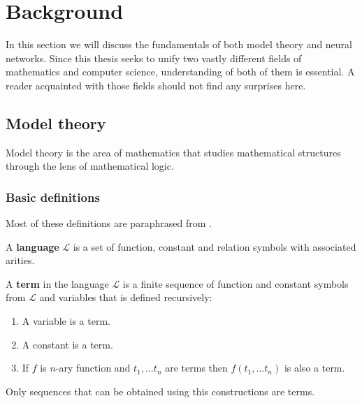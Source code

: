 \chapter{Background}
In this section we will discuss the fundamentals of both model theory and neural networks. Since this thesis seeks to unify two vastly different fields of mathematics and computer science, understanding of both of them is essential. A reader acquainted with those fields should not find any surprises here.


\section{Model theory}
Model theory is the area of mathematics that studies mathematical structures through the lens of mathematical logic.
\subsection{Basic definitions}
\label{section:basics}
Most of these definitions are paraphrased from \cite{model}.
\begin{defn} A \textbf{language} $\mathcal{L}$ is a set of function, constant and relation symbols with associated arities.
\end{defn}

\begin{defn} A \textbf{term} in the language $\mathcal{L}$ is a finite sequence of function and constant symbols from $\mathcal{L}$ and variables that is defined recursively:
	\begin{enumerate}
	\item A variable is a term.
	\item A constant is a term.
	\item If $f$ is $n$-ary function and $t_1, \dots t_n$ are terms then $f(t_1, \dots t_n)$ is also a term.
	\end{enumerate}
Only sequences that can be obtained using this constructions are terms.
\end{defn}


